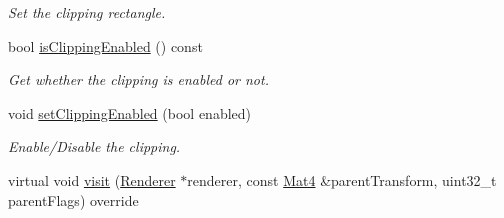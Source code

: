 \begin{DoxyCompactItemize}
\begin{DoxyCompactList}\small\item\em Set the clipping rectangle. \end{DoxyCompactList}\item 
bool \hyperlink{classClippingRectangleNode_a8ebbf22123f002ba75266e25e050a031}{is\+Clipping\+Enabled} () const
\begin{DoxyCompactList}\small\item\em Get whether the clipping is enabled or not. \end{DoxyCompactList}\item 
void \hyperlink{classClippingRectangleNode_a3748322e0d2a5e082eaf2c56d74c6229}{set\+Clipping\+Enabled} (bool enabled)
\begin{DoxyCompactList}\small\item\em Enable/\+Disable the clipping. \end{DoxyCompactList}\item 
virtual void \hyperlink{classClippingRectangleNode_acffefe2919ca5110110e091d79448260}{visit} (\hyperlink{classRenderer}{Renderer} $\ast$renderer, const \hyperlink{classMat4}{Mat4} \&parent\+Transform, uint32\+\_\+t parent\+Flags) override
\end{DoxyCompactItemize}
